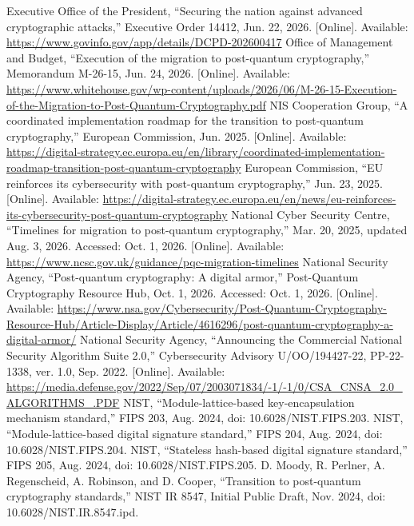  Executive Office of the President, ``Securing the nation against advanced cryptographic attacks,'' Executive Order 14412, Jun. 22, 2026. [Online]. Available: \url{https://www.govinfo.gov/app/details/DCPD-202600417}
 Office of Management and Budget, ``Execution of the migration to post-quantum cryptography,'' Memorandum M-26-15, Jun. 24, 2026. [Online]. Available: \url{https://www.whitehouse.gov/wp-content/uploads/2026/06/M-26-15-Execution-of-the-Migration-to-Post-Quantum-Cryptography.pdf}
 NIS Cooperation Group, ``A coordinated implementation roadmap for the transition to post-quantum cryptography,'' European Commission, Jun. 2025. [Online]. Available: \url{https://digital-strategy.ec.europa.eu/en/library/coordinated-implementation-roadmap-transition-post-quantum-cryptography}
 European Commission, ``EU reinforces its cybersecurity with post-quantum cryptography,'' Jun. 23, 2025. [Online]. Available: \url{https://digital-strategy.ec.europa.eu/en/news/eu-reinforces-its-cybersecurity-post-quantum-cryptography}
 National Cyber Security Centre, ``Timelines for migration to post-quantum cryptography,'' Mar. 20, 2025, updated Aug. 3, 2026. Accessed: Oct. 1, 2026. [Online]. Available: \url{https://www.ncsc.gov.uk/guidance/pqc-migration-timelines}
 National Security Agency, ``Post-quantum cryptography: A digital armor,'' Post-Quantum Cryptography Resource Hub, Oct. 1, 2026. Accessed: Oct. 1, 2026. [Online]. Available: \url{https://www.nsa.gov/Cybersecurity/Post-Quantum-Cryptography-Resource-Hub/Article-Display/Article/4616296/post-quantum-cryptography-a-digital-armor/}
 National Security Agency, ``Announcing the Commercial National Security Algorithm Suite 2.0,'' Cybersecurity Advisory U/OO/194427-22, PP-22-1338, ver. 1.0, Sep. 2022. [Online]. Available: \url{https://media.defense.gov/2022/Sep/07/2003071834/-1/-1/0/CSA_CNSA_2.0_ALGORITHMS_.PDF}
 NIST, ``Module-lattice-based key-encapsulation mechanism standard,'' FIPS 203, Aug. 2024, doi: 10.6028/NIST.FIPS.203.
 NIST, ``Module-lattice-based digital signature standard,'' FIPS 204, Aug. 2024, doi: 10.6028/NIST.FIPS.204.
 NIST, ``Stateless hash-based digital signature standard,'' FIPS 205, Aug. 2024, doi: 10.6028/NIST.FIPS.205.
 D. Moody, R. Perlner, A. Regenscheid, A. Robinson, and D. Cooper, ``Transition to post-quantum cryptography standards,'' NIST IR 8547, Initial Public Draft, Nov. 2024, doi: 10.6028/NIST.IR.8547.ipd.
